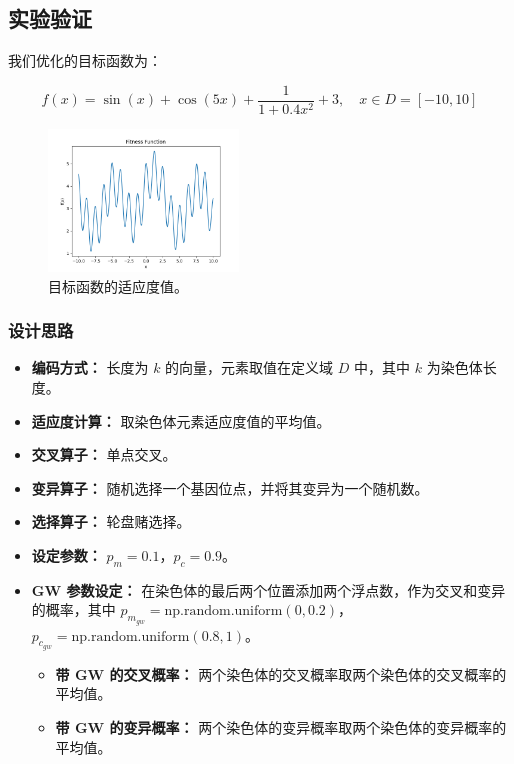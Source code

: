 \documentclass[journal=gmj]{report}%
\theoremstyle{definition}
\numberwithin{equation}{section}
\begin{document}
\subsection{实验验证}

我们优化的目标函数为：

$$
f(x) = \sin(x) + \cos(5x) + \frac{1}{1 + 0.4x^2} + 3, \quad x \in D = [-10, 10]
$$

\begin{figure}[H]
    \centering
    \includegraphics[width=0.45\textwidth]{../assets/img/fitness_function.png}
    \caption{目标函数的适应度值。}
    \label{fig:fitness}
\end{figure}

\subsubsection{设计思路}

\begin{itemize}
  \item \textbf{编码方式：} 长度为 $k$ 的向量，元素取值在定义域 $D$ 中，其中 $k$ 为染色体长度。
  \item \textbf{适应度计算：} 取染色体元素适应度值的平均值。
  \item \textbf{交叉算子：} 单点交叉。
  \item \textbf{变异算子：} 随机选择一个基因位点，并将其变异为一个随机数。
  \item \textbf{选择算子：} 轮盘赌选择。
  \item \textbf{设定参数：} $p_m = 0.1$，$p_c = 0.9$。
  \item \textbf{GW 参数设定：} 在染色体的最后两个位置添加两个浮点数，作为交叉和变异的概率，其中 $p_{m_{gw}} = \text{np.random.uniform}(0, 0.2)$，$p_{c_{gw}} = \text{np.random.uniform}(0.8, 1)$。
    \begin{itemize}
      \item \textbf{带 GW 的交叉概率：} 两个染色体的交叉概率取两个染色体的交叉概率的平均值。
      \item \textbf{带 GW 的变异概率：} 两个染色体的变异概率取两个染色体的变异概率的平均值。
    \end{itemize}
\end{itemize}
\end{document}
